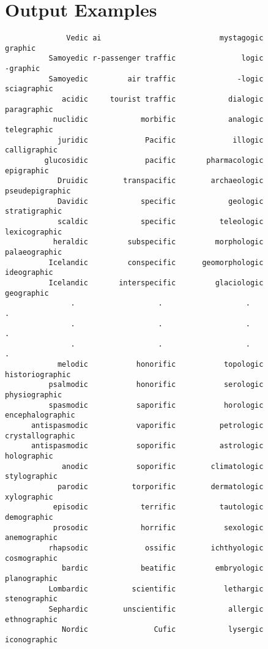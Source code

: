 \section{Output Examples}
\footnotesize
\begin{verbatim}
              Vedic ai                           mystagogic             graphic 
          Samoyedic r-passenger traffic               logic            -graphic 
          Samoyedic         air traffic              -logic         sciagraphic 
             acidic     tourist traffic            dialogic         paragraphic 
           nuclidic            morbific            analogic         telegraphic 
            juridic             Pacific             illogic        calligraphic 
         glucosidic             pacific       pharmacologic          epigraphic 
            Druidic        transpacific        archaeologic     pseudepigraphic 
            Davidic            specific            geologic       stratigraphic 
            scaldic            specific          teleologic       lexicographic 
           heraldic         subspecific         morphologic       palaeographic 
          Icelandic         conspecific      geomorphologic         ideographic 
          Icelandic       interspecific         glaciologic          geographic 
               .                   .                   .                   .
               .                   .                   .                   .
               .                   .                   .                   .
            melodic           honorific           topologic     historiographic 
          psalmodic           honorific           serologic       physiographic 
          spasmodic           saporific           horologic    encephalographic 
      antispasmodic           vaporific          petrologic    crystallographic 
      antispasmodic           soporific          astrologic         holographic 
             anodic           soporific        climatologic        stylographic 
            parodic          torporific        dermatologic         xylographic 
           episodic            terrific          tautologic         demographic 
           prosodic            horrific           sexologic        anemographic 
          rhapsodic             ossific        ichthyologic        cosmographic 
             bardic            beatific         embryologic        planographic 
          Lombardic          scientific           lethargic        stenographic 
          Sephardic        unscientific            allergic        ethnographic 
             Nordic               Cufic            lysergic        iconographic 

\end{verbatim}
